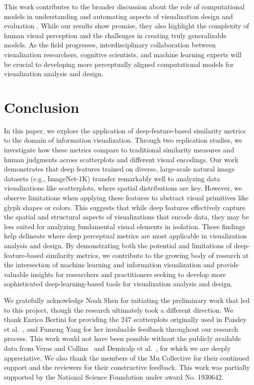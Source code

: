 \documentclass[sigconf]{acmart}
\begin{document}
This work contributes to the broader discussion about the role of computational models in understanding and automating aspects of visualization design and evaluation \cite{demiralpVisualEmbeddingModel2014}. While our results show promise, they also highlight the complexity of human visual perception and the challenges in creating truly generalizable models. As the field progresses, interdisciplinary collaboration between visualization researchers, cognitive scientists, and machine learning experts will be crucial to developing more perceptually aligned computational models for visualization analysis and design.
\section{Conclusion}
\label{sec:conclusion}

In this paper, we explore the application of deep-feature-based similarity metrics to the domain of information visualization. Through two replication studies, we investigate how these metrics compare to traditional similarity measures and human judgments across scatterplots and different visual encodings. Our work demonstrates that deep features trained on diverse, large-scale natural image datasets (e.g., ImageNet-1K) transfer remarkably well to analyzing data visualizations like scatterplots, where spatial distributions are key. However, we observe limitations when applying these features to abstract visual primitives like glyph shapes or colors. This suggests that while deep features effectively capture the spatial and structural aspects of visualizations that encode data, they may be less suited for analyzing fundamental visual elements in isolation. These findings help delineate where deep perceptual metrics are most applicable in visualization analysis and design. By demonstrating both the potential and limitations of deep-feature-based similarity metrics, we contribute to the growing body of research at the intersection of machine learning and information visualization \cite{wu2021ai4vis} and provide valuable insights for researchers and practitioners seeking to develop more sophisticated deep-learning-based tools for visualization analysis and design.


\begin{acks}
We gratefully acknowledge Noah Shen for initiating the preliminary work that led to this project, though the research ultimately took a different direction. We thank Enrico Bertini for providing the 247 scatterplots originally used in Pandey et al.~\cite{pandey2016towards}, and Fumeng Yang for her invaluable feedback throughout our research process. This work would not have been possible without the publicly available data from Veras and Collins~\cite{veras2019discriminability} and Demiralp et al.~\cite{demiralp2014learning}, for which we are deeply appreciative. We also thank the members of the Mu Collective for their continued support and the reviewers for their constructive feedback. 
This work was partially supported by the National Science Foundation under award No. 1930642.
\end{acks}
\end{document}
